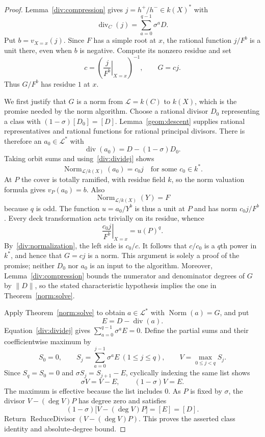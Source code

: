\begin{proof}
Lemma~\ref{div:compression} gives $j=h^+/h^-\in k(X)^*$ with
\begin{equation}\label{div:dividej}
 \operatorname{div}_C(j)=\sum_{a=0}^{q-1}\sigma^aD.
\end{equation}
Put $b=v_{X=x}(j)$.  Since $F$ has a simple root at $x$, the rational
function $j/F^b$ is a unit there, even when $b$ is negative.  Compute its
nonzero residue and set
\begin{equation}\label{div:normalization}
 c=\left(\left.\frac{j}{F^b}\right|_{X=x}\right)^{-1},
 \qquad G=cj.
\end{equation}
Thus $G/F^b$ has residue $1$ at $x$.

We first justify that $G$ is a norm from $\mathcal L=k(C)$ to $k(X)$,
which is the promise needed by the norm algorithm.  Choose a rational
divisor $D_0$ representing a class with $(1-\sigma)[D_0]=[D]$.
Lemma~\ref{geom:descent} supplies rational representatives and rational
functions for rational principal divisors.  There is therefore an
$a_0\in\mathcal L^*$ with
\[
 \operatorname{div}(a_0)=D-(1-\sigma)D_0.
\]
Taking orbit sums and using~\eqref{div:dividej} shows
\[
 \operatorname{Norm}_{\mathcal L/k(X)}(a_0)=c_0j
 \quad\text{for some }c_0\in k^*.
\]
At $P$ the cover is totally ramified, with residue field $k$, so the norm
valuation formula gives $v_P(a_0)=b$.  Also
\[
 \operatorname{Norm}_{\mathcal L/k(X)}(Y)=F
\]
because $q$ is odd.  The function $u=a_0/Y^b$ is thus a unit at $P$ and
has norm $c_0j/F^b$.  Every deck transformation acts trivially on its
residue, whence
\[
 \left.\frac{c_0j}{F^b}\right|_{X=x}=u(P)^q.
\]
By~\eqref{div:normalization}, the left side is $c_0/c$.  It follows that
$c/c_0$ is a $q$th power in $k^*$, and hence that $G=cj$ is a norm.
This argument is solely a proof of the promise; neither $D_0$ nor $a_0$
is an input to the algorithm.
Moreover, Lemma~\ref{div:compression} bounds the numerator and denominator
degrees of $G$ by $\|D\|$, so the stated characteristic hypothesis implies
the one in Theorem~\ref{norm:solve}.

Apply Theorem~\ref{norm:solve} to obtain $a\in\mathcal L^*$ with
$\operatorname{Norm}(a)=G$, and put
\[
 E=D-\operatorname{div}(a).
\]
Equation~\eqref{div:dividej} gives
$\sum_{a=0}^{q-1}\sigma^aE=0$.  Define the partial sums and their
coefficientwise maximum by
\begin{equation}\label{div:maximum}
 S_0=0,\qquad S_j=\sum_{a=0}^{j-1}\sigma^aE\ (1\leq j\leq q),
 \qquad V=\max_{0\leq j<q}S_j.
\end{equation}
Since $S_q=S_0=0$ and $\sigma S_j=S_{j+1}-E$, cyclically indexing the
same list shows
\[
 \sigma V=V-E,\qquad (1-\sigma)V=E.
\]
The maximum is effective because the list includes $0$.  As $P$ is
fixed by $\sigma$, the divisor
$V-(\deg V)P$ has degree zero and satisfies
\[
 (1-\sigma)\bigl[V-(\deg V)P\bigr]=[E]=[D].
\]
Return $\operatorname{ReduceDivisor}(V-(\deg V)P)$.  This proves the
asserted class identity and absolute-degree bound.


\end{proof}
